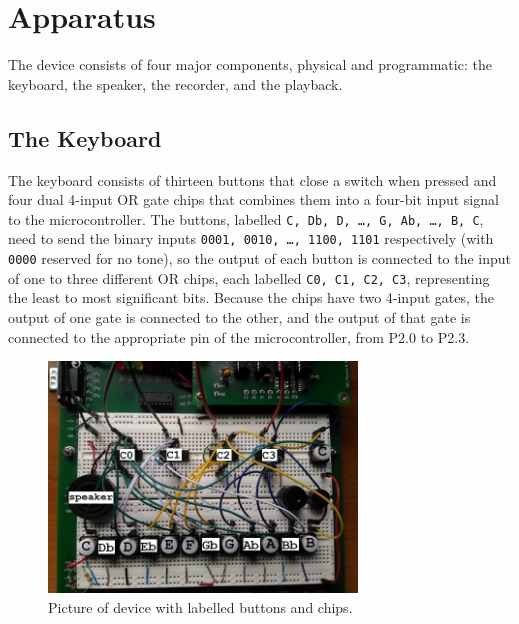 \documentclass[letterpaper]{report}
\begin{document}
	\chapter{Apparatus}
	The device consists of four major components, physical and programmatic: the keyboard, the speaker, the recorder, and the playback.
		\section{The Keyboard}
			The keyboard consists of thirteen buttons that close a switch when pressed and four dual 4-input OR gate chips that combines them into a four-bit input signal to the microcontroller. The buttons, labelled \texttt{C, Db, D, \dots, G, Ab, \dots, B, C}, need to send the binary inputs \texttt{0001, 0010, \dots, 1100, 1101} respectively (with \texttt{0000} reserved for no tone), so the output of each button is connected to the input of one to three different OR chips, each labelled \texttt{C0, C1, C2, C3}, representing the least to most significant bits. Because the chips have two 4-input gates, the output of one gate is connected to the other, and the output of that gate is connected to the appropriate pin of the microcontroller, from P2.0 to P2.3. 
			
			\begin{figure}[H]
				\centering
				\includegraphics[width=0.73\textwidth]{wiring}
				\caption{Picture of device with labelled buttons and chips.}
			\end{figure}
			
\end{document}
